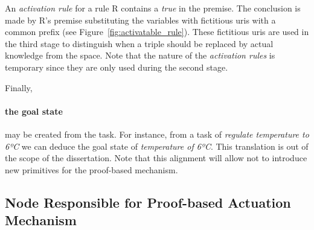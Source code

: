% 


An \emph{activation rule} for a rule R contains a \emph{true} in the premise.
The conclusion is made by R's premise substituting the variables with fictitious \acsp{uri} with a common prefix (see Figure~\ref{fig:activatable_rule}).
These fictitious \acsp{uri} are used in the third stage to distinguish when a triple should be replaced by actual knowledge from the space. %
Note that the nature of the \emph{activation rules} is temporary since they are only used during the second stage.



Finally, \paragraph{the goal state} may be created from the task.
For instance, from a task of \emph{regulate temperature to 6ºC} we can deduce the goal state of \emph{temperature of 6ºC}.
This translation is out of the scope of the dissertation.
Note that this alignment will allow not to introduce new primitives for the proof-based mechanism.



\subsection{Node Responsible for Proof-based Actuation Mechanism}
\label{sec:responsible_proof}

